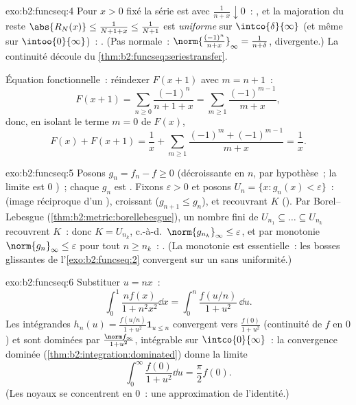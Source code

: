 \begin{solution}{exo:b2:funcseq:4}
Pour $x > 0$ fixé la série est  avec $\frac{1}{n + x}
\downarrow 0$~: , et la majoration du reste
$\abs{R_N(x)} \leq \frac{1}{N + 1 + x} \leq \frac{1}{N+1}$ est
\emph{uniforme} sur $\intco{\delta}{\infty}$ (et même sur
$\intoo{0}{\infty}$)~: . (Pas normale~:
$\norm{\frac{(-1)^n}{n+x}}_\infty = \frac{1}{n + \delta}$,
divergente.) La continuité découle du
\cref{thm:b2:funcseq:seriestransfer}.

Équation fonctionnelle~: réindexer $F(x + 1)$ avec $m = n + 1$~:
\[
F(x+1) = \sum_{n\geq0} \frac{(-1)^n}{n + 1 + x}
= \sum_{m\geq1}\frac{(-1)^{m-1}}{m+x} ,
\]
donc, en isolant le terme $m = 0$ de $F(x)$,
\[
F(x) + F(x+1)
= \frac{1}{x} + \sum_{m\geq1}
\frac{(-1)^m + (-1)^{m-1}}{m+x} = \frac1x .
\]
\end{solution}

\begin{solution}{exo:b2:funcseq:5}
Posons $g_n = f_n - f \geq 0$ (décroissante en $n$, par hypothèse~; la
limite est $0$ )~; chaque $g_n$ est . Fixons
$\varepsilon > 0$ et posons $U_n = \{x : g_n(x) < \varepsilon\}$~:
 (image réciproque d'un ), croissant ($g_{n+1} \leq g_n$),
et recouvrant $K$ (). Par Borel--Lebesgue
(\cref{thm:b2:metric:borellebesgue}), un nombre fini de $U_{n_1}
\subseteq \dots \subseteq U_{n_k}$ recouvrent $K$~: donc $K = U_{n_k}$,
c.-à-d.\ $\norm{g_{n_k}}_\infty \leq \varepsilon$, et par monotonie
$\norm{g_n}_\infty \leq \varepsilon$ pour tout $n \geq n_k$~:
. (La monotonie est essentielle~: les bosses
glissantes de l'\cref{exo:b2:funcseq:2} convergent  sur un
 sans uniformité.)
\end{solution}

\begin{solution}{exo:b2:funcseq:6}
Substituer $u = nx$~:
\[
\int_0^1 \frac{n f(x)}{1 + n^2x^2}\dd x
= \int_0^n \frac{f(u/n)}{1 + u^2}\,\dd u .
\]
Les intégrandes $h_n(u) = \frac{f(u/n)}{1+u^2}\mathbf{1}_{u \leq n}$
convergent  vers $\frac{f(0)}{1+u^2}$ (continuité de $f$ en
$0$) et sont dominées par $\frac{\norm f_\infty}{1 + u^2}$,
intégrable sur $\intco{0}{\infty}$~: la convergence dominée
(\cref{thm:b2:integration:dominated}) donne la limite
\[
\int_0^\infty \frac{f(0)}{1 + u^2}\dd u = \frac{\pi}{2} f(0) .
\]
(Les noyaux se concentrent en $0$~: une approximation de l'identité.)
\end{solution}


